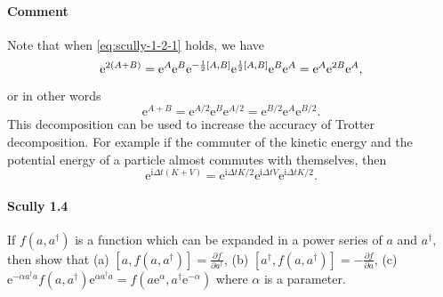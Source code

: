 \documentclass[hyperref, a4paper]{article}
\newcommand*{\ii}{\mathrm{i}}
\newcommand*{\ee}{\mathrm{e}}
\begin{document}
\paragraph{Comment} Note that when \eqref{eq:scully-1-2-1} holds, we have 
\begin{equation}
    \ee^{2(A+B)} = \ee^{A} \ee^{B} \ee^{- \frac{1}{2} \comm*{A}{B}} \ee^{\frac{1}{2} \comm*{A}{B}} \ee^{B} \ee^{A} = \ee^{A} \ee^{2B} \ee^{A},
\end{equation}
or in other words
\begin{equation}
    \ee^{A+B} = \ee^{A/2} \ee^{B} \ee^{A/2} = \ee^{B/2} \ee^{A} \ee^{B/2}.
\end{equation}
This decomposition can be used to increase the accuracy of Trotter decomposition.
For example if the commuter of the kinetic energy and the potential energy of a particle almost commutes with themselves, then 
\begin{equation}
    \ee^{\ii \Delta t (K+V)} = \ee^{\ii \Delta t K / 2} \ee^{\ii \Delta t V} \ee^{\ii \Delta t K / 2}.
\end{equation}

\paragraph{}

\paragraph{Scully 1.4} If $f\left(a, a^{\dagger}\right)$ is a function which can be expanded in a power series of $a$ and $a^{\dagger}$, then show that
(a) $\left[a, f\left(a, a^{\dagger}\right)\right]=\frac{\partial f}{\partial a^{\dagger}}$,
(b) $\left[a^{\dagger}, f\left(a, a^{\dagger}\right)\right]=-\frac{\partial f}{\partial a}$,
(c) $\ee^{-\alpha a^{\dagger} a} f\left(a, a^{\dagger}\right) \ee^{\alpha a^{\dagger} a}=f\left(a \ee^{\alpha}, a^{\dagger} \ee^{-\alpha}\right)$
where $\alpha$ is a parameter.
\end{document}
